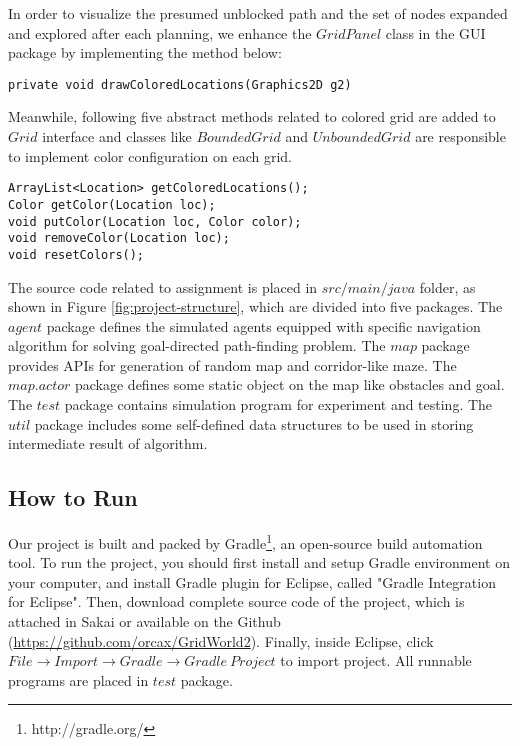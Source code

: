 In order to visualize the presumed unblocked path and the set of nodes expanded
and explored after each planning, we enhance the $GridPanel$ class in the 
GUI package by implementing the method below:

\begin{lstlisting}
private void drawColoredLocations(Graphics2D g2)
\end{lstlisting}

Meanwhile, following five abstract methods related to colored grid are added 
to $Grid$ interface and classes like $BoundedGrid$ and $UnboundedGrid$ are 
responsible to implement color configuration on each grid.

\begin{lstlisting}
ArrayList<Location> getColoredLocations();
Color getColor(Location loc);
void putColor(Location loc, Color color);
void removeColor(Location loc);
void resetColors();
\end{lstlisting}

The source code related to assignment is placed in $src/main/java$ folder, as 
shown in Figure \ref{fig:project-structure}, which are divided into five packages.
The $agent$ package defines the simulated agents equipped with specific navigation 
algorithm for solving goal-directed path-finding problem. The $map$ package 
provides APIs for generation of random map and corridor-like maze. The $map.actor$ 
package defines some static object on the map like obstacles and goal. The $test$
package contains simulation program for experiment and testing. The $util$
package includes some self-defined data structures to be used in storing 
intermediate result of algorithm.

\subsection{How to Run}

Our project is built and packed by Gradle\footnote{http://gradle.org/}, 
an open-source build automation tool. To run the project, you should first 
install and setup Gradle environment on your computer, and install Gradle plugin 
for Eclipse, called "Gradle Integration for Eclipse". Then, download complete 
source code of the project, which is attached in Sakai or available on the 
Github (\url{https://github.com/orcax/GridWorld2}). Finally, inside Eclipse,
click $File\rightarrow Import\rightarrow Gradle\rightarrow Gradle~Project$ to
import project. All runnable programs are placed in $test$ package.

